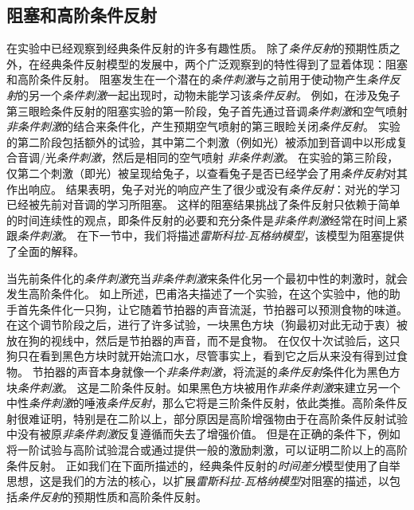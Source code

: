 \subsection{阻塞和高阶条件反射} \label{sec:blocking_higher_order}

在实验中已经观察到经典条件反射的许多有趣性质。
除了\textit{条件反射}的预期性质之外，在经典条件反射模型的发展中，两个广泛观察到的特性得到了显着体现：阻塞和高阶条件反射。
阻塞发生在一个潜在的\textit{条件刺激}与之前用于使动物产生\textit{条件反射}的另一个\textit{条件刺激}一起出现时，动物未能学习该\textit{条件反射}。
例如，在涉及兔子第三眼睑条件反射的阻塞实验的第一阶段，兔子首先通过音调\textit{条件刺激}和空气喷射 \textit{非条件刺激}的结合来条件化，产生预期空气喷射的第三眼睑关闭\textit{条件反射}。
实验的第二阶段包括额外的试验，其中第二个刺激（例如光）被添加到音调中以形成复合音调/光\textit{条件刺激}，然后是相同的空气喷射 \textit{非条件刺激}。
在实验的第三阶段，仅第二个刺激（即光）被呈现给兔子，以查看兔子是否已经学会了用\textit{条件反射}对其作出响应。
结果表明，兔子对光的响应产生了很少或没有\textit{条件反射}：对光的学习已经被先前对音调的学习所阻塞。
这样的阻塞结果挑战了条件反射只依赖于简单的时间连续性的观点，即条件反射的必要和充分条件是\textit{非条件刺激}经常在时间上紧跟\textit{条件刺激}。
在下一节中，我们将描述\textit{雷斯科拉-瓦格纳模型}\cite{rescorla1972theory}，该模型为阻塞提供了全面的解释。



当先前条件化的\textit{条件刺激}充当\textit{非条件刺激}来条件化另一个最初中性的刺激时，就会发生高阶条件化。
如上所述，巴甫洛夫描述了一个实验，在这个实验中，他的助手首先条件化一只狗，让它随着节拍器的声音流涎，节拍器可以预测食物的味道。
在这个调节阶段之后，进行了许多试验，一块黑色方块（狗最初对此无动于衷）被放在狗的视线中，然后是节拍器的声音，而不是食物。
在仅仅十次试验后，这只狗只在看到黑色方块时就开始流口水，尽管事实上，看到它之后从来没有得到过食物。
节拍器的声音本身就像一个\textit{非条件刺激}，将流涎的\textit{条件反射}条件化为黑色方块\textit{条件刺激}。
这是二阶条件反射。如果黑色方块被用作\textit{非条件刺激}来建立另一个中性\textit{条件刺激}的唾液\textit{条件反射}，那么它将是三阶条件反射，依此类推。高阶条件反射很难证明，特别是在二阶以上，部分原因是高阶增强物由于在高阶条件反射试验中没有被原\textit{非条件刺激}反复遵循而失去了增强价值。
但是在正确的条件下，例如将一阶试验与高阶试验混合或通过提供一般的激励刺激，可以证明二阶以上的高阶条件反射。
正如我们在下面所描述的，经典条件反射的\textit{时间差分}模型使用了自举思想，这是我们的方法的核心，以扩展\textit{雷斯科拉-瓦格纳模型}对阻塞的描述，以包括\textit{条件反射}的预期性质和高阶条件反射。
	

